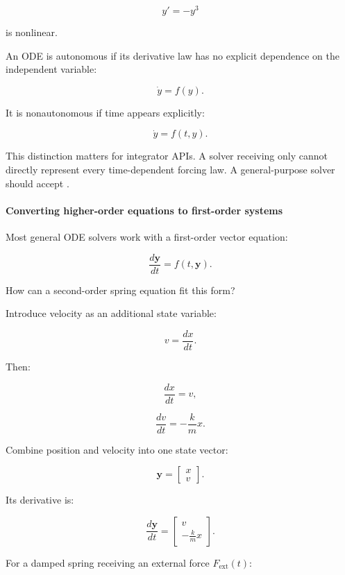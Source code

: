 \[
y'=-y^3
\]

is nonlinear.

An ODE is autonomous if its derivative law has no explicit dependence on the independent variable:

\[
\dot y=f(y).
\]

It is nonautonomous if time appears explicitly:

\[
\dot y=f(t,y).
\]

This distinction matters for integrator APIs. A solver receiving only  cannot directly represent every time-dependent forcing law. A general-purpose solver should accept .

\paragraph{Converting higher-order equations to first-order systems}\label{02-foundations-ii-ch022-converting-higher-order-equations-to-first-order-systems}

\hypertarget{02-foundations-ii-ch022-converting-higher-order-equations-to-first-order-systems}{}

Most general ODE solvers work with a first-order vector equation:

\[
\boxed{ \frac{d\mathbf y}{dt}=f(t,\mathbf y) }.
\]

How can a second-order spring equation fit this form?

Introduce velocity as an additional state variable:

\[
v=\frac{dx}{dt}.
\]

Then:

\[
\frac{dx}{dt}=v,
\]

\[
\frac{dv}{dt}=-\frac{k}{m}x.
\]

Combine position and velocity into one state vector:

\[
\mathbf y= \begin{bmatrix} x\\v \end{bmatrix}.
\]

Its derivative is:

\[
\boxed{ \frac{d\mathbf y}{dt} = \begin{bmatrix} v\\ -\frac{k}{m}x \end{bmatrix} }.
\]

For a damped spring receiving an external force \(F_{\mathrm{ext}}(t)\):

